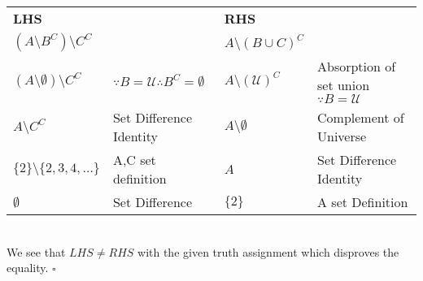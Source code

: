 \documentclass{article}
\begin{document}
  \begin{table}[ht]
     \centering
     \begin{tabular}{llll}
     \textbf{LHS} & &  \textbf{RHS}&\\
   $(A\setminus B^C)\setminus C^C$&& $A\setminus (B\cup C)^C$&\\
   
   $(A\setminus \emptyset)\setminus C^C$ & $\because B=\mathcal{U} \therefore B^C=\emptyset$ & $A\setminus (\mathcal{U})^C$ & Absorption of set union $\because B=\mathcal{U}$ \\
   
   $A\setminus C^C$ & Set Difference Identity & $A\setminus \emptyset$& Complement of Universe \\
   
   $\{2\}\setminus\{2,3,4,\dots\}$ & A,C set definition &$A$ & Set Difference Identity\\
   
   $\emptyset$ & Set Difference &$\{2\}$& A set Definition\\
   
     \end{tabular}
 \end{table} \\

 We see that $LHS \neq RHS$ with the given truth assignment which disproves the equality. $\square$
\end{document}
